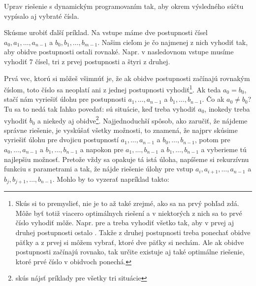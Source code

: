 \begin{uloha}
  Uprav riešenie s dynamickým programovaním tak, aby okrem výsledného súčtu vypísalo aj vybraté čísla.
\end{uloha}


Skúsme urobiť ďalší príklad. Na vstupe máme dve postupnosti čísel
$a_0, a_1, \ldots, a_{n-1}$ a $b_0, b_1, \ldots, b_{m-1}$. Našim cieľom je 
čo najmenej z nich vyhodiť tak, aby obidve postupnosti ostali rovnaké. Napr. v nasledovnom vstupe musíme vyhodiť
7 čísel, tri z prvej postupnosti a štyri z druhej.






Prvá vec, ktorú si môžeš všimnúť je, že ak obidve postupnosti začínajú rovnakým
číslom, toto číslo sa neoplatí ani z jednej postupnosti vyhodiť\footnote{ Skús
si to premyslieť, nie je to až také zrejmé, ako sa na prvý pohľad zdá.  Môže
byť totiž viacero optimálnych riešení a v niektorých z nich sa to prvé číslo
vyhodiť môže. Napr. pre  a  treba vyhodiť všetko tak, aby
v prvej aj druhej postupnosti ostalo . Takže z druhej postupnosti treba
ponechať obidve päťky a z prvej si môžem vybrať, ktoré dve päťky si nechám.
Ale ak obidve postupnosti začínajú rovnako, tak určite existuje aj také
optimálne riešenie, ktoré prvé číslo v obidvoch ponechá.  }. Ak teda $a_0=b_0$,
stačí nám vyriešiť úlohu pre postupnosti $a_1,\ldots, a_{n-1}$ a
$b_1,\ldots,b_{n-1}$. Čo ak $a_0\not=b_0$? Tu sa to nedá tak ľahko povedať: 
sú situácie, keď treba vyhodiť $a_0$, inokedy treba vyhodiť $b_0$
a niekedy aj obidve\footnote{skús nájsť príklady pre všetky tri situácie}.
Najjednoduchší spôsob, ako zaručiť, že nájdeme správne riešenie, je vyskúšať
všetky možnosti, to znamená, že najprv skúsime vyriešiť úlohu pre
dvojicu postupností $a_1,\ldots,a_{n-1}$ a $b_0,\ldots,b_{n-1}$, potom
pre $a_0,\ldots,a_{n-1}$ a $b_1,\ldots,b_{n-1}$ a napokon pre $a_1,\ldots,b_{n-1}$
a $b_1,\ldots,b_{n-1}$ a vyberieme tú najlepšiu možnosť. 
Pretože vždy sa opakuje tá istá úloha, napíšeme si rekurzívnu funkciu 
 s parametrami  a  tak, že  nájde riešenie
úlohy pre vstup $a_i,a_{i+1},\ldots,a_{n-1}$ a $b_j,b_{j+1},\ldots,b_{n-1}$.
Mohlo by to vyzerať napríklad takto:\\


